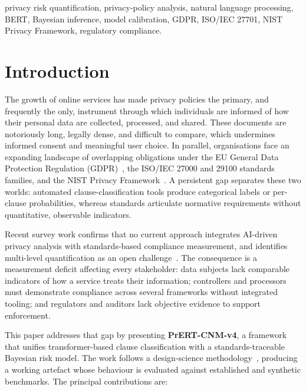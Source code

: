 \documentclass[conference]{IEEEtran}
\begin{document}
\begin{IEEEkeywords}
privacy risk quantification, privacy-policy analysis, natural language
processing, BERT, Bayesian inference, model calibration, GDPR, ISO/IEC
27701, NIST Privacy Framework, regulatory compliance.
\end{IEEEkeywords}

\section{Introduction}\label{sec:intro}
The growth of online services has made privacy policies the primary, and
frequently the only, instrument through which individuals are informed of
how their personal data are collected, processed, and shared. These
documents are notoriously long, legally dense, and difficult to compare,
which undermines informed consent and meaningful user choice. In parallel,
organisations face an expanding landscape of overlapping obligations under
the EU General Data Protection Regulation (GDPR)~\cite{gdpr2016}, the
ISO/IEC 27000 and 29100 standards families, and the NIST Privacy
Framework~\cite{nist_pf_2020}. A persistent gap separates these two
worlds: automated clause-classification tools produce categorical labels
or per-clause probabilities, whereas standards articulate normative
requirements without quantitative, observable indicators.

Recent survey work confirms that no current approach integrates AI-driven
privacy analysis with standards-based compliance measurement, and
identifies multi-level quantification as an open
challenge~\cite{arshad2024characterisation}. The consequence is a measurement
deficit affecting every stakeholder: data subjects lack comparable
indicators of how a service treats their information; controllers and
processors must demonstrate compliance across several frameworks without
integrated tooling; and regulators and auditors lack objective evidence to
support enforcement.

This paper addresses that gap by presenting \textbf{PrERT-CNM-v4}, a
framework that unifies transformer-based clause classification with a
standards-traceable Bayesian risk model. The work follows a design-science
methodology~\cite{hevner2004design}, producing a working artefact whose
behaviour is evaluated against established and synthetic benchmarks. The
principal contributions are:
\end{document}

